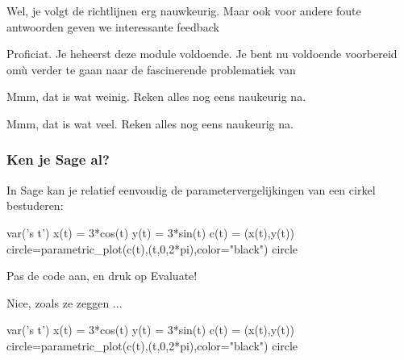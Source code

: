 \documentclass[handout]{ximera}
\begin{document}
\begin{problem}
\begin{question}
 
      
          \begin{feedback}[y==7]
            Wel, je volgt de richtlijnen erg nauwkeurig. Maar ook voor andere foute antwoorden geven we interessante feedback
          \end{feedback}
          \begin{feedback}[y==8]
          Proficiat. Je heheerst deze module voldoende. Je bent nu voldoende voorbereid omù verder te gaan naar de fascinerende problematiek van 
          \end{feedback}
          \begin{feedback}[y<7]
              Mmm, dat is wat weinig. Reken alles nog eens naukeurig na.
            \end{feedback}
          \begin{feedback}[y>8]
               Mmm, dat is wat veel. Reken alles nog eens naukeurig na.
           \end{feedback}
       \end{question}
\end{problem}

\subsubsection{Ken je Sage al?}

In Sage kan je relatief eenvoudig de parametervergelijkingen van een cirkel bestuderen:

\begin{sageCell}
    var('s t')
    x(t) = 3*cos(t)
    y(t) = 3*sin(t)
    c(t) = (x(t),y(t))
    circle=parametric_plot(c(t),(t,0,2*pi),color="black")
    circle
\end{sageCell}


\begin{onlineOnly}
    
    Pas de code aan, en druk op Evaluate!
    
    Nice, zoals ze zeggen ...
    
\begin{sageOutput}
    var('s t')
    x(t) = 3*cos(t)
    y(t) = 3*sin(t)
    c(t) = (x(t),y(t))
    circle=parametric_plot(c(t),(t,0,2*pi),color="black")
    circle
\end{sageOutput}
\end{onlineOnly}
\end{document}
